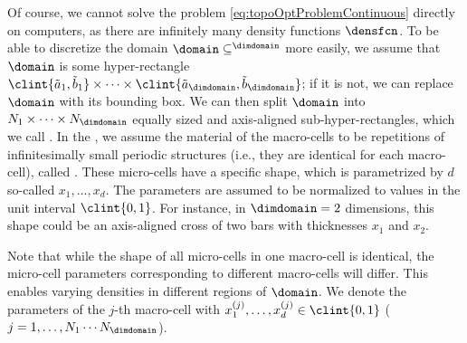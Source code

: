 Of course, we cannot solve the problem \eqref{eq:topoOptProblemContinuous}
directly on computers,
as there are infinitely many density functions $\densfcn$.
To be able to discretize the domain $\domain \subset \real^{\dimdomain}$
more easily, we assume that $\domain$ is some hyper-rectangle
$\clint{\tilde{a}_1, \tilde{b}_1} \times \dotsb \times
\clint{\tilde{a}_{\dimdomain}, \tilde{b}_{\dimdomain}}$;
if it is not, we can replace $\domain$ with its bounding box.
We can then split $\domain$ into $N_1 \times \dotsb \times N_{\dimdomain}$
equally sized and axis-aligned sub-hyper-rectangles,
which we call .
In the ,
we assume the material of the macro-cells to be
repetitions of infinitesimally small periodic structures
(i.e., they are identical for each macro-cell),
called .
These micro-cells have a specific shape, which is parametrized by $d$ so-called
 $x_1, \dotsc, x_d$.
The parameters are assumed to be normalized to values in the
unit interval $\clint{0, 1}$.
For instance, in $\dimdomain = 2$ dimensions,
this shape could be an axis-aligned cross of two bars
with thicknesses $x_1$ and $x_2$.

Note that while the shape of all micro-cells in one macro-cell is identical,
the micro-cell parameters corresponding to different macro-cells will differ.
This enables varying densities in different regions of $\domain$.
We denote the parameters of the $j$-th macro-cell
with $x_1^{(j)}, \dotsc, x_d^{(j)} \in \clint{0, 1}$
($j = 1, \dotsc, N_1 \dotsm N_{\dimdomain}$).

\blindtext{}











































